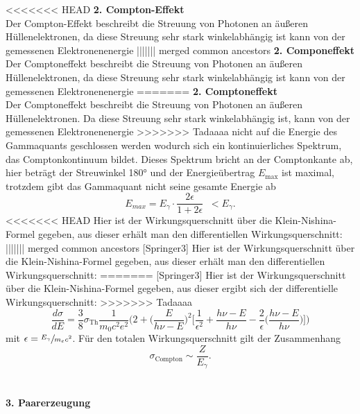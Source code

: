 <<<<<<< HEAD
\textbf{2. Compton-Effekt}\\
Der Compton-Effekt beschreibt die Streuung von Photonen an äußeren Hüllenelektronen, da
diese Streuung sehr stark winkelabhängig ist kann von der gemessenen Elektronenenergie
||||||| merged common ancestors
\textbf{2. Componeffekt}\\
Der Comptoneffekt beschreibt die Streuung von Photonen an äußeren Hüllenelektronen, da
diese Streuung sehr stark winkelabhängig ist kann von der gemessenen Elektronenenergie
=======
\textbf{2. Comptoneffekt}\\
Der Comptoneffekt beschreibt die Streuung von Photonen an äußeren Hüllenelektronen. Da
diese Streuung sehr stark winkelabhängig ist, kann von der gemessenen Elektronenenergie
>>>>>>> Tadaaaa
nicht auf die Energie des Gammaquants geschlossen werden wodurch sich ein kontinuierliches
Spektrum, das Comptonkontinuum bildet. Dieses Spektrum bricht an der Comptonkante ab, hier
beträgt der Streuwinkel 180° und der Energieübertrag $E_{\text{max}}$ ist maximal, trotzdem gibt das
Gammaquant nicht seine gesamte Energie ab
\begin{equation}
  E_{max}=E_{\gamma}\cdot\frac{2\epsilon}{1+2\epsilon}\;\;<E_{\gamma}.
  \label{eqn:kante}
\end{equation}
<<<<<<< HEAD
\cite{Springer3}
Hier ist der Wirkungsquerschnitt über die Klein-Nishina-Formel gegeben, aus dieser erhält man
den differentiellen Wirkungsquerschnitt:
||||||| merged common ancestors
[Springer3]
Hier ist der Wirkungsquerschnitt über die Klein-Nishina-Formel gegeben, aus dieser erhält man
den differentiellen Wirkungsquerschnitt:
=======
[Springer3]
Hier ist der Wirkungsquerschnitt über die Klein-Nishina-Formel gegeben, aus dieser ergibt sich der
differentielle Wirkungsquerschnitt:
>>>>>>> Tadaaaa
\begin{equation}
  \frac{d\sigma}{dE}=\frac{3}{8}\sigma_{\text{Th}}\frac{1}{m_0 c^2 e^2}\bigg(2+\bigg(\frac{E}{h\nu-E} \bigg)^2 \bigg[\frac{1}{\epsilon^2}+
  \frac{h\nu-E}{h\nu}-\frac{2}{\epsilon}\bigg(\frac{h\nu-E}{h\nu}\bigg) \bigg]\bigg)
  \label{eqn:diffCompton}
\end{equation}
mit $\epsilon=\sfrac{E_{\gamma}}{m_e c^2}$.
Für den totalen Wirkungsquerschnitt gilt der Zusammenhang
\begin{equation}
  \sigma_{\text{Compton}}\sim \frac{Z}{E_{\gamma}}.
  \label{eqn:WPCompton}
\end{equation}
\\
\\
\textbf{3. Paarerzeugung}\\
